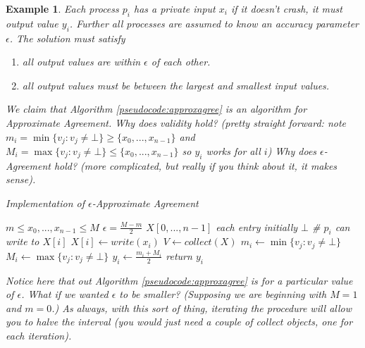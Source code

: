 \documentclass[twoside]{article}
\newtheorem{example}[theorem]{Example}
\begin{document}
\begin{example}
Each process $p_i$ has a private input $x_i$ if it doesn't crash, it must output value $y_i$. Further all processes are assumed to know an accuracy parameter $\epsilon$. The solution must satisfy
\begin{enumerate}
\item[$\epsilon$-Agreement:] all output values are within $\epsilon$ of each other.
\item[Validity:] all output values must be between the largest and smallest input values.
\end{enumerate}

We claim that Algorithm \ref{pseudocode:approxagree} is an algorithm for Approximate Agreement. Why does validity hold? (pretty straight forward: note $m_i = \min\{v_j: v_j \neq \bot\} \geq \{x_0, ..., x_{n-1}\}$ and $M_i = \max\{v_j: v_j\neq \bot\} \leq \{x_0, ..., x_{n-1}\}$ so $y_i$ works for all $i$) Why does $\epsilon$-Agreement hold? (more complicated, but really if you think about it, it makes sense).

\begin{algorithm}
	\caption{Implementation of $\epsilon$-Approximate Agreement}
    \label{pseudocode:approxagree}
    \begin{algorithmic}[1]
	\State $m \leq x_0, ..., x_{n-1} \leq M$
	\State $\epsilon = \frac{M-m}{2}$
	\State $X[0, ..., n-1]$ each entry initially $\bot$ \# $p_i$ can write to $X[i]$
	\State	
	\State $X[i] \leftarrow write(x_i)$
	\State $V \leftarrow collect(X)$
	\State $m_i \leftarrow \min\{v_j: v_j \neq \bot\}$
	\State $M_i \leftarrow \max\{v_j: v_j \neq \bot\}$
	\State $y_i \leftarrow \frac{m_i+M_i}{2}$
	\State return $y_i$
	\end{algorithmic}
\end{algorithm}

Notice here that out Algorithm \ref{pseudocode:approxagree} is for a particular value of $\epsilon$. What if we wanted $\epsilon$ to be smaller? (Supposing we are beginning with $M = 1$ and $m = 0$.) As always, with this sort of thing, iterating the procedure will allow you to halve the interval (you would just need a couple of collect objects, one for each iteration).
\end{example}
\end{document}
